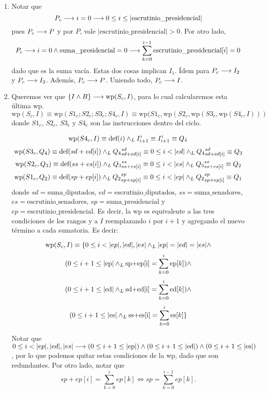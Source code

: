 \documentclass[10pt,a4paper]{article}
\newcommand{\var}{\text}
\renewcommand{\wp}{\text{wp}}
\newcommand{\isDef}{\text{def}}
\begin{document}
\begin{enumerate}
    \item Notar que
    $$P_c\implica i = 0\implica 0\leq i\leq |\var{escrutinio\_presidencial}|$$
    pues $P_c\longrightarrow P$ y por $P$, vale $|\var{escrutinio\_presidencial}| > 0$. Por otro lado,
    $$P_c\implica i = 0\land \var{suma\_presidencial} = 0\implica \sum_{k=0}^{i-1}{\var{escrutinio\_presidencial}[i]} = 0$$
    dado que es la suma vacía.
    Estas dos cosas implican $I_1$. Ídem para $P_c \longrightarrow I_2$ y $P_c \longrightarrow I_3$. Además, $P_c \longrightarrow P$. Uniendo todo, $P_c \longrightarrow I$.

    \item Queremos ver que $\{I \land B\} \implica \wp(S_c, I)$, para lo cual calcularemos esta última wp.
    $$\wp(S_c, I) \equiv \wp(S1_c; S2_c; S3_c; S4_c, I)\equiv \wp(S1_c, \wp(S2_c, \wp(S3_c, \wp(S4_c, I)))$$
    donde $S1_c$, $S2_c$, $S3_c$ y $S4_c$ son las instrucciones dentro del ciclo.

    $$\wp(S4_c, I) \equiv \isDef(i)\yLuego I_{i+1}^{i} \equiv I_{i+1}^{i}\equiv
    Q_4$$
    $$\wp(S3_c, Q_4)\equiv \isDef(sd + ed[i]) \yLuego Q_4{}_{sd+ed[i]}^{sd} \equiv 0 \leq i < |ed| \yLuego Q_4{}_{sd+ed[i]}^{sd} \equiv Q_3$$
    $$\wp(S2_c, Q_3)\equiv \isDef(ss + es[i]) \yLuego Q_3{}_{ss+es[i]}^{ss} \equiv 0 \leq i < |es| \yLuego Q_3{}_{ss+es[i]}^{ss} \equiv Q_2$$ 
    $$\wp(S1_c, Q_2)\equiv \isDef(sp + ep[i]) \yLuego Q_2{}_{sp+ep[i]}^{sp} \equiv 0 \leq i < |ep| \yLuego Q_2{}_{sp+ep[i]}^{sp} \equiv Q_1$$ 
    donde $sd = \var{suma\_diputados}$, $ed = \var{escrutinio\_diputados}$, $ss = \var{suma\_senadores}$, $es = \var{escrutinio\_senadores}$, $sp = \var{suma\_presidencial}$ y $ep = \var{escrutinio\_presidencial}$. Es decir, la wp es equivalente a las tres condiciones de los rangos y a $I$ reemplazando $i$ por $i+1$ y agregando el nuevo término a cada sumatoria. Es decir:
    
    $$\wp(S_c, I)\equiv \{0 \leq i < |ep|, |ed|, |es| \yLuego |ep| = |ed| = |es| \land $$
    $$(0\leq i+1\leq |\var{ep}|\yLuego \var{sp+ep[i]} = \sum_{k=0}^{i}{\var{ep}[k]}) \land $$
    $$(0\leq i+1\leq |\var{ed}|\yLuego \var{sd+ed[i]} = \sum_{k=0}^{i}{\var{ed}[k]}) \land $$
    $$(0\leq i+1\leq |\var{es}|\yLuego \var{ss+es[i]} = \sum_{k=0}^{i}{\var{es}[k]}\}$$
    
    Notar que $0 \leq i < |ep|, |ed|, |es|\implica (0\leq i+1\leq |\var{ep}|) \land (0\leq i+1\leq |\var{ed}|) \land (0\leq i+1\leq |\var{es}|)$, por lo que podemos quitar estas condiciones de la wp, dado que son redundantes. Por otro lado, notar que
    $$sp + ep[i] = \sum_{k=0}^i{ep[k]}\iff sp = \sum_{k=0}^{i-1}{ep[k]}.$$


\end{enumerate}
\end{document}
